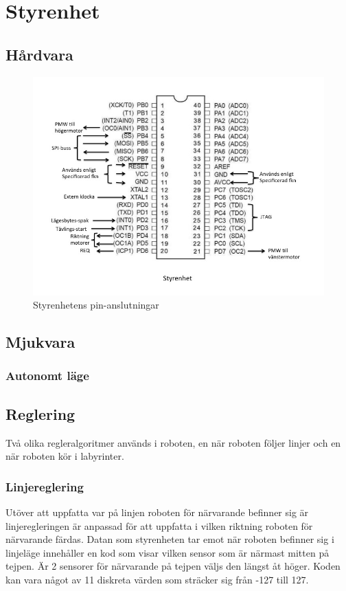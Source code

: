 \section{Styrenhet}

\subsection{Hårdvara}

\begin{figure}[H]
  \centering
 \includegraphics[angle=0,scale=0.5]{bilder/PIN_styr.jpg}
  \caption{Styrenhetens pin-anslutningar}
  \label{fig:PINstyr}
\end{figure}


\subsection{Mjukvara}

\subsubsection{Autonomt läge}

\subsection{Reglering}
Två olika regleralgoritmer används i roboten, en när roboten följer linjer och
en när roboten kör i labyrinter.
\subsubsection{Linjereglering}
Utöver att uppfatta var på linjen roboten för närvarande befinner sig är linjeregleringen är anpassad för att uppfatta i vilken riktning roboten för närvarande färdas. Datan som styrenheten tar emot när roboten befinner sig i linjeläge innehåller en kod som visar vilken sensor som är närmast mitten på tejpen. Är 2 sensorer för närvarande på tejpen väljs den längst åt höger. Koden kan vara något av 11 diskreta värden som sträcker sig från -127 till 127.


